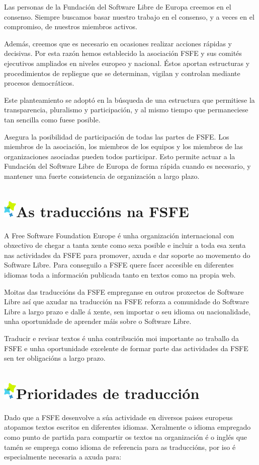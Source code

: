 \documentclass[10pt,foldmark,tumble]{leaflet}
\newcommand{\tit}[1]{\section{\includegraphics{item.png}#1}}
\begin{document}
Las personas de la Fundación del Software Libre de Europa creemos en el consenso. Siempre buscamos basar nuestro trabajo en el consenso, y a veces en el compromiso, de nuestros miembros activos.

Además, creemos que es necesario en ocasiones realizar acciones rápidas y decisivas. Por esta razón hemos establecido la asociación FSFE y sus comités ejecutivos ampliados en niveles europeo y nacional. Éstos aportan estructuras y procedimientos de repliegue que se determinan, vigilan y controlan mediante procesos democráticos.

Este planteamiento se adoptó en la búsqueda de una estructura que permitiese la transparencia, pluralismo y participación, y al mismo tiempo que permaneciese tan sencilla como fuese posible.

Asegura la posibilidad de participación de todas las partes de FSFE. Los miembros de la asociación, los miembros de los equipos y los miembros de las organizaciones asociadas pueden todos participar. Esto permite actuar a la Fundación del Software Libre de Europa de forma rápida cuando es necesario, y mantener una fuerte consistencia de organización a largo plazo.

\tit{As traduccións na FSFE}

A Free Software Foundation Europe é unha organización internacional con obxectivo de chegar a tanta xente como sexa posible e incluir a toda esa xenta nas actividades da FSFE para promover, axuda e dar soporte ao movemento do Software Libre. Para conseguilo a FSFE quere facer accesible en diferentes idiomas toda a información publicada tanto en textos como na propia web.

Moitas das traduccións da FSFE empreganse en outros proxectos de Software Libre así que axudar na traducción na FSFE reforza a comunidade do Software Libre a largo prazo e dalle á xente, sen importar o seu idioma ou nacionalidade, unha oportunidade de aprender máis sobre o Software Libre.

Traducir e revisar textos é unha contribución moi importante ao traballo da FSFE e unha oportunidade excelente de formar parte das actividades da FSFE sen ter obligacións a largo prazo.

\tit{Prioridades de traducción}

Dado que a FSFE desenvolve a súa actividade en diversos paises europeus atopamos textos escritos en diferentes idiomas. Xeralmente o idioma empregado como punto de partida para compartir os textos na organización é o inglés que tamén se emprega como idioma de referencia para as traduccións, por iso é especialmente necesaria a axuda para: 
\end{document}
